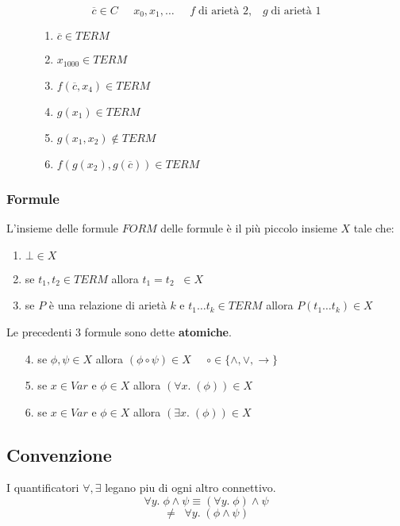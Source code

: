 \documentclass{article}
\theoremstyle{break}
\theoremstyle{break}
\theoremstyle{break}
\theoremstyle{break}
\begin{document}
\begin{figure}[H]
  \begin{example}
    \[
      \overline{c} \in C\;\;\;\;\; x_0, x_1, \ldots \;\;\;\;\; f\; \text{di arietà 2}, \;\;\; g\; \text{di arietà 1}
    \] 
    \begin{enumerate}
      \item \( \overline{c} \in TERM \) 
      \item \( x_{1000} \in TERM \) 
      \item \( f(\overline{c}, x_4) \in TERM\) 
      \item \( g(x_1) \in TERM \) 
      \item  \( g(x_1, x_2) \notin TERM \) 
      \item \( f(g(x_2), g(\overline{c})) \in TERM \) 
    \end{enumerate}
  \end{example}
\end{figure}

\subsubsection{Formule}
L'insieme delle formule \( FORM \) delle formule è il più piccolo insieme \( X \) tale che:
\begin{enumerate}
  \item \( \bot \in X \) 
  \item se \( t_1,t_2 \in TERM \) allora \( t_1 = t_2\;\; \in X \) 
  \item se \( P \) è una relazione di arietà \( k \) e \( t_1 \ldots t_k \in TERM \) allora \( P(t_1 \ldots t_k) \in X \)
\end{enumerate}
Le precedenti 3 formule sono dette \textbf{atomiche}. 
\begin{enumerate}
  \item [4.] se \( \phi, \psi \in X \) allora \( (\phi \circ \psi) \in X \;\;\;\;\; \circ \in  \{\wedge, \vee, \to \} \) 
  \item [5.] se \( x \in Var \) e \( \phi \in X \) allora \( (\forall x.\; (\phi)) \in X \) 
  \item [6.] se \( x \in Var \) e \( \phi \in X \) allora \( (\exists x.\; (\phi)) \in X \) 
\end{enumerate}

\subsection{Convenzione}
I quantificatori \( \forall , \exists  \) legano piu di ogni altro connettivo.
\[
\forall y.\; \phi \wedge \psi \equiv (\forall y.\; \phi) \wedge \psi
\] 
\[
\neq \;\; \forall y.\; (\phi \wedge \psi)
\] 
\end{document}
